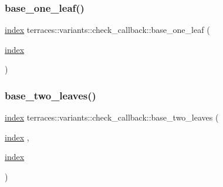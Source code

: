 \mbox{\label{classterraces_1_1variants_1_1check__callback_aa681c54dfde633ae4707d7e5bd5f19a0}} 
\subsubsection{\texorpdfstring{base\+\_\+one\+\_\+leaf()}{base\_one\_leaf()}}
{\footnotesize\ttfamily \hyperlink{namespaceterraces_adbc33ccb543d1634e96d0eb02e472c77}{index} terraces\+::variants\+::check\+\_\+callback\+::base\+\_\+one\+\_\+leaf (\begin{DoxyParamCaption}\item[{\hyperlink{namespaceterraces_adbc33ccb543d1634e96d0eb02e472c77}{index}}]{ }\end{DoxyParamCaption})\hspace{0.3cm}{\ttfamily [inline]}}

\mbox{\label{classterraces_1_1variants_1_1check__callback_a103b75a312ea500b98981324eae79635}} 
\subsubsection{\texorpdfstring{base\+\_\+two\+\_\+leaves()}{base\_two\_leaves()}}
{\footnotesize\ttfamily \hyperlink{namespaceterraces_adbc33ccb543d1634e96d0eb02e472c77}{index} terraces\+::variants\+::check\+\_\+callback\+::base\+\_\+two\+\_\+leaves (\begin{DoxyParamCaption}\item[{\hyperlink{namespaceterraces_adbc33ccb543d1634e96d0eb02e472c77}{index}}]{,  }\item[{\hyperlink{namespaceterraces_adbc33ccb543d1634e96d0eb02e472c77}{index}}]{ }\end{DoxyParamCaption})\hspace{0.3cm}{\ttfamily [inline]}}

